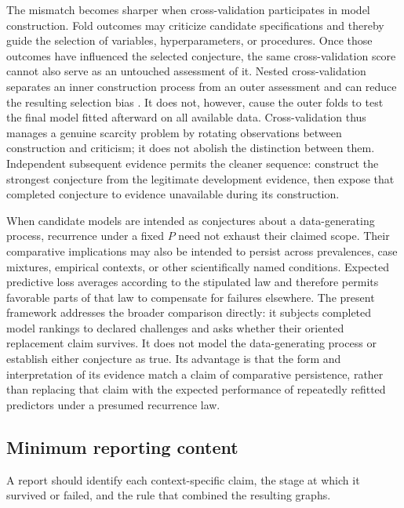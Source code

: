 \documentclass[11pt]{article}
\theoremstyle{remark}
\begin{document}
The mismatch becomes sharper when cross-validation participates in model
construction. Fold outcomes may criticize candidate specifications and thereby
guide the selection of variables, hyperparameters, or procedures. Once those
outcomes have influenced the selected conjecture, the same cross-validation
score cannot also serve as an untouched assessment of it. Nested
cross-validation separates an inner construction process from an outer
assessment and can reduce the resulting selection bias
\cite{varma2006bias,cawley2010overfitting}. It does not, however, cause the
outer folds to test the final model fitted afterward on all available data.
Cross-validation thus manages a genuine scarcity problem by rotating
observations between construction and criticism; it does not abolish the
distinction between them. Independent subsequent evidence permits the cleaner
sequence: construct the strongest conjecture from the legitimate development
evidence, then expose that completed conjecture to evidence unavailable during
its construction.

When candidate models are intended as conjectures about a data-generating
process, recurrence under a fixed $P$ need not exhaust their claimed scope.
Their comparative implications may also be intended to persist across
prevalences, case mixtures, empirical contexts, or other scientifically named
conditions. Expected predictive loss averages according to the stipulated law
and therefore permits favorable parts of that law to compensate for failures
elsewhere. The present framework addresses the broader comparison directly:
it subjects completed model rankings to declared challenges and asks whether
their oriented replacement claim survives. It does not model the
data-generating process or establish either conjecture as true. Its advantage
is that the form and interpretation of its evidence match a claim of
comparative persistence, rather than replacing that claim with the expected
performance of repeatedly refitted predictors under a presumed recurrence law.

\subsection{Minimum reporting content}

A report should identify each context-specific claim, the stage at which it
survived or failed, and the rule that combined the resulting graphs.
\end{document}
